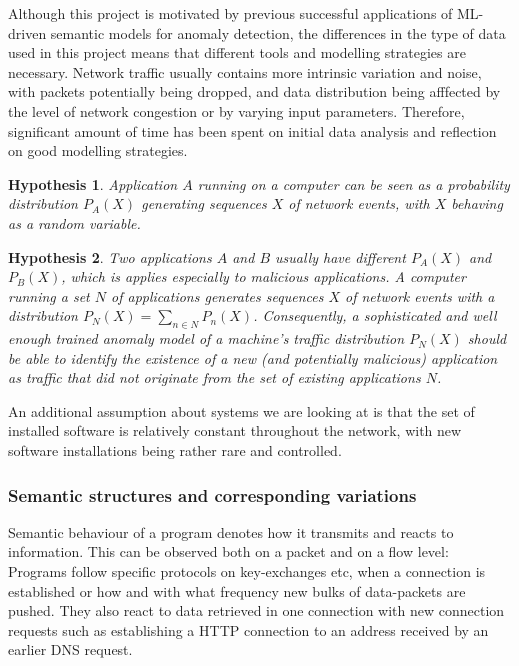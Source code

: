 \documentclass[a4paper,12pt,twoside]{report}
\newtheorem{hypothesis}{Hypothesis}
\begin{document}
Although this project is motivated by previous successful applications of ML-driven semantic models for anomaly detection, the differences in the type of data used in this project means that different tools and modelling strategies are necessary. Network traffic usually contains more intrinsic variation and noise, with packets potentially being dropped, and data distribution being afffected by the level of network congestion or by varying input parameters. Therefore, significant amount of time has been spent on initial data analysis and reflection on good modelling strategies. 


\begin{hypothesis}\label{Ass1}
Application $A$ running on a computer can be seen as a probability distribution $P_A(X)$ generating sequences $X$ of network events, with $X$ behaving as a random variable.
\end{hypothesis}

\begin{hypothesis}\label{Ass2}
Two applications $A$ and $B$ usually have different $P_A(X)$ and $P_B(X)$, which is applies especially to malicious applications. A computer running a set $N$ of applications %
generates sequences $X$ of network events with a distribution $P_N(X)=\sum_{n\in N}P_n(X)$. Consequently, a sophisticated and well enough trained anomaly model of a machine's traffic distribution $P_N(X)$ should be able to identify the existence of a new (and potentially malicious) application as traffic that did not originate from the set of existing applications $N$.
\end{hypothesis}

An additional assumption about systems we are looking at is that the set of installed software is relatively constant throughout the network, with new software installations being rather rare and controlled. 

\subsubsection{Semantic structures and corresponding variations}

Semantic behaviour of a program denotes how it transmits and reacts to information. This can be observed both on a packet and on a flow level: Programs follow specific protocols on key-exchanges etc, when a connection is established or how and with what frequency new bulks of data-packets are pushed. They also react to data retrieved in one connection with new connection requests such as establishing a HTTP connection to an address received by an earlier DNS request. 
\end{document}
